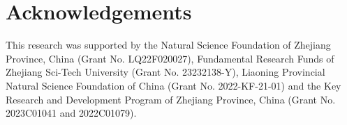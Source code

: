 \documentclass[a4paper,fleqn,twocolumn]{cas-dc}
\newcommand{\1}[1]{\mathds{1}\left[#1\right]}
\begin{document}
%

\section*{Acknowledgements}
This research was supported by the Natural Science Foundation of Zhejiang Province, China (Grant No. LQ22F020027), Fundamental Research Funds of Zhejiang Sci-Tech University (Grant No. 23232138-Y), Liaoning Provincial Natural Science Foundation of China (Grant No. 2022-KF-21-01) and the Key Research and Development Program of Zhejiang Province, China (Grant No. 2023C01041 and 2022C01079).


% 

\end{document}
